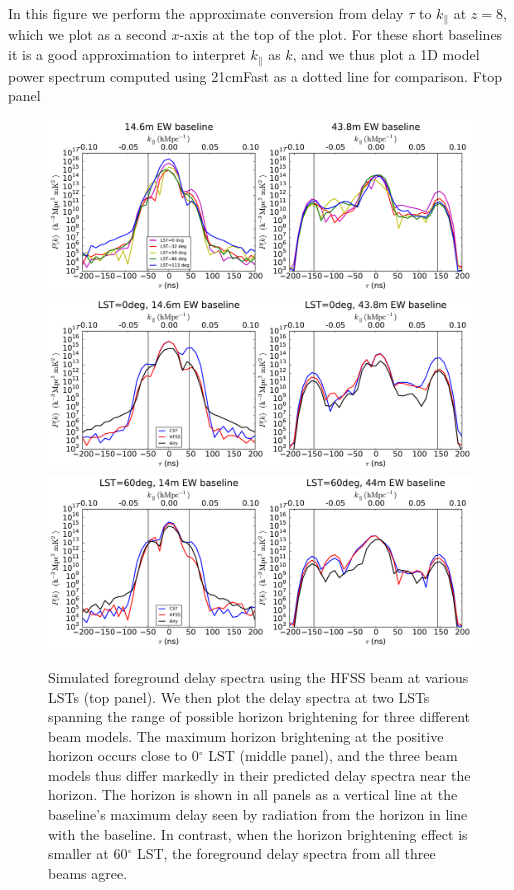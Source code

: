\documentclass{emulateapj}
\begin{document}
In this figure we perform the approximate conversion from delay $\tau$ to $k_\parallel$ at $z=8$, which we plot as a second $x$-axis at the top of the plot. For these short baselines it is a good approximation to interpret $k_\parallel$ as $k$, and we thus plot a 1D model power spectrum computed using 21cmFast \citep{21cmfast} as a dotted line for comparison. 
Ftop panel
\begin{figure}[h]
\centering
\includegraphics[width=6in]{nithya_fg_pspec_all_lst.pdf}
\includegraphics[width=6in]{nithya_fg_pspec_lst0deg.pdf}
\includegraphics[width=6in]{nithya_fg_pspec_lst60deg.pdf}
\caption{Simulated foreground delay spectra using the HFSS beam at various LSTs (top panel). We then plot the delay spectra at two LSTs spanning the range of possible horizon brightening for three different beam models. The maximum horizon brightening at the positive horizon occurs close to 0$^\circ$ LST (middle panel), and the three beam models thus differ markedly in their predicted delay spectra near the horizon. The horizon is shown in all panels as a vertical line at the baseline's maximum delay seen by radiation from the horizon in line with the baseline. In contrast, when the horizon brightening effect is smaller at 60$^\circ$ LST, the foreground delay spectra from all three beams agree.}
\label{fig:delayspec}
\end{figure}
\end{document}
